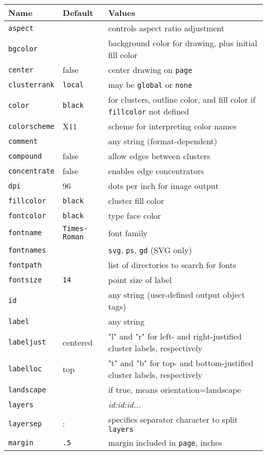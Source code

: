 \documentclass[11pt]{article}
\begin{document}
{%
{\footnotesize
\begin{tabular}[t]{|l|l|p{3.5in}|} \hline
Name & Default & Values \\ \hline
{\tt aspect} &  & controls aspect ratio adjustment \\
{\tt bgcolor} &  & background color for drawing, plus initial fill color \\
{\tt center} & false & center drawing on {\tt page} \\ 
{\tt clusterrank} & {\tt local} & may be {\tt global} or {\tt none} \\
{\tt color} & {\tt black} & for clusters, outline color, and fill color
if {\tt fillcolor} not defined \\
{\tt colorscheme} & X11 & scheme for interpreting color names \\
{\tt comment} & & any string (format-dependent) \\
{\tt compound} & false & allow edges between clusters \\
{\tt concentrate} & false & enables edge concentrators  \\ 
{\tt dpi} & 96 & dots per inch for image output \\
{\tt fillcolor} & {\tt black} & cluster fill color \\
{\tt fontcolor} & {\tt black} & type face color \\ 
{\tt fontname} & {\tt Times-Roman} & font family \\
{\tt fontnames} & & {\tt svg}, {\tt ps}, {\tt gd} (SVG only) \\
{\tt fontpath} &  & list of directories to search for fonts \\
{\tt fontsize} & {\tt 14} & point size of label \\
{\tt id} & & any string (user-defined output object tags) \\
{\tt label} & & any string \\
{\tt labeljust} & centered & "l" and "r" for left- and right-justified 
cluster labels, respectively \\
{\tt labelloc} & top & "t" and "b" for top- and bottom-justified cluster 
labels, respectively \\
{\tt landscape} & & if true, means orientation=landscape \\
{\tt layers} & & {\it id:id:id...} \\
{\tt layersep} & : & specifies separator character to split {\tt layers} \\
{\tt margin} & {\tt .5} & margin included in {\tt page}, inches \\

\end{tabular}}}
\end{document}
